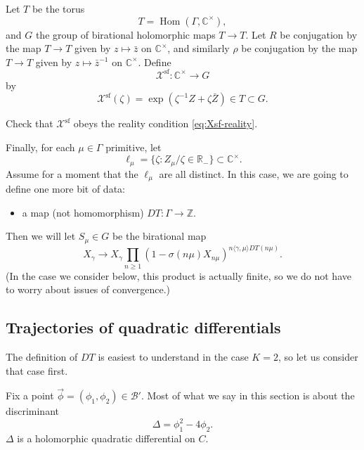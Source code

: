 \documentclass[12pt,letterpaper,reqno]{article}
\numberwithin{equation}{section}
\newcommand{\cB}{\ensuremath{\mathcal B}}
\newcommand{\cX}{\ensuremath{\mathcal X}}
\newcommand{\R}{\ensuremath{\mathbb R}}
\newcommand{\C}{\ensuremath{\mathbb C}}
\newcommand{\Z}{\ensuremath{\mathbb Z}}
\renewcommand{\sf}{\mathrm{sf}}
\newcommand{\IP}[1]{\langle#1\rangle}
\DeclareMathOperator{\Hom}{Hom}
\newcommand{\fixme}[1]{{\color{orange}{[#1]}}}
\begin{document}
Let $T$ be the torus
\begin{equation}
  T = \Hom(\Gamma, \C^\times),
\end{equation}
and $G$ the group of birational holomorphic maps $T \to T$.
Let $R$ be conjugation by the map $T \to T$ given by
$z \mapsto \bar{z}$ on $\C^\times$, and similarly
$\rho$ be conjugation by the map
$T \to T$ given by $z \mapsto \bar{z}^{-1}$ on $\C^\times$.
Define
\begin{equation}
\cX^\sf: \C^\times \to G
\end{equation}
by 
\begin{equation}
\cX^\sf(\zeta) = \exp(\zeta^{-1} Z + \zeta \bar{Z}) \in T \subset G.
\end{equation}

\begin{exercise} Check that $\cX^\sf$ obeys the reality condition 
\eqref{eq:Xsf-reality}.
\end{exercise}

Finally, for each $\mu \in \Gamma$ primitive, let
$$\ell_\mu = \{ \zeta: Z_\mu / \zeta \in \R_- \} \subset \C^\times. $$
Assume for a moment that the $\ell_\mu$
are all distinct.
In this case, we are going to define one more bit of data:
\begin{itemize}
  \item a map (not homomorphism) $DT: \Gamma \to \Z$.
\end{itemize}
Then we will let $S_\mu \in G$ be the birational map
\begin{equation}
  X_\gamma \to X_\gamma \prod_{n \ge 1} (1 - \sigma(n\mu) X_{n\mu})^{n \IP{\gamma,\mu} DT(n\mu)}.
\end{equation}
(In the case we consider below, this product is actually finite,
so we do not have to worry about issues of convergence.)


\subsection{Trajectories of quadratic differentials}

The definition of $DT$ is easiest to understand in the 
case $K=2$, so let us consider that case first.
\fixme{ref Strebel, Klemm-Lerche-Mayr-Vafa-Warner, Bridgeland-Smith}

Fix a point $\vec\phi = (\phi_1, \phi_2) \in \cB'$.
Most of what we say in this section is about the discriminant
\begin{equation}
\Delta = \phi_1^2	- 4 \phi_2.
\end{equation}
$\Delta$ is a holomorphic quadratic differential on $C$.
\end{document}
